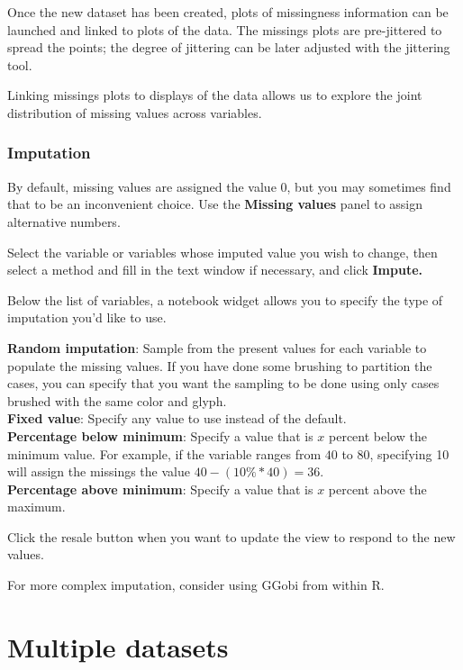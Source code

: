 \documentclass[11pt]{article}
\begin{document}
Once the new dataset has been created, plots of missingness information
can be launched and linked to plots of the data.  The missings plots
are pre-jittered to spread the points; the degree of jittering can
be later adjusted with the jittering tool.

Linking missings plots to displays of the data allows us to explore the
joint distribution of missing values across variables.

\subsubsection{Imputation}

%
By default, missing values are assigned the value $0$, but you
may sometimes find that to be an inconvenient choice.  Use the
{\bf Missing values} panel to assign alternative numbers.

Select the variable or variables whose imputed value you
wish to change, then select a method and fill in the text window
if necessary, and click {\bf Impute.}

Below the list of variables, a notebook widget allows you to specify
the type of imputation you'd like to use.

{\bf Random imputation}: Sample from the present values for each variable
  to populate the missing values.  If you have done some brushing to
  partition the cases, you can specify that you want the sampling to be
  done using only cases brushed with the same color and glyph.
\\{\bf Fixed value}: Specify any value to use instead of the default.
\\{\bf Percentage below minimum}: Specify a value that is $x$ percent
  below the minimum value.  For example, if the variable ranges from
 $40$ to $80$, specifying 10 will assign the missings the value $40 - (10\%
 * 40) = 36$.
\\{\bf Percentage above minimum}: Specify a value that is $x$ percent
above the maximum.

Click the resale button when you want to update the view to
respond to the new values.

For more complex imputation, consider using GGobi from within R.

%
%

\section{Multiple datasets}
\end{document}
